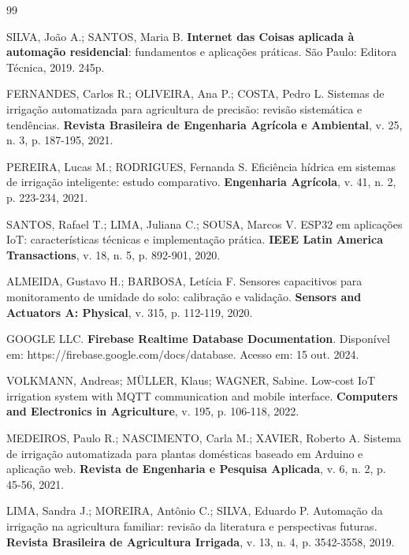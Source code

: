 
\begin{thebibliography}{99}

SILVA, João A.; SANTOS, Maria B. \textbf{Internet das Coisas aplicada à automação residencial}: fundamentos e aplicações práticas. São Paulo: Editora Técnica, 2019. 245p.

FERNANDES, Carlos R.; OLIVEIRA, Ana P.; COSTA, Pedro L. Sistemas de irrigação automatizada para agricultura de precisão: revisão sistemática e tendências. \textbf{Revista Brasileira de Engenharia Agrícola e Ambiental}, v. 25, n. 3, p. 187-195, 2021.

PEREIRA, Lucas M.; RODRIGUES, Fernanda S. Eficiência hídrica em sistemas de irrigação inteligente: estudo comparativo. \textbf{Engenharia Agrícola}, v. 41, n. 2, p. 223-234, 2021.

SANTOS, Rafael T.; LIMA, Juliana C.; SOUSA, Marcos V. ESP32 em aplicações IoT: características técnicas e implementação prática. \textbf{IEEE Latin America Transactions}, v. 18, n. 5, p. 892-901, 2020.

ALMEIDA, Gustavo H.; BARBOSA, Letícia F. Sensores capacitivos para monitoramento de umidade do solo: calibração e validação. \textbf{Sensors and Actuators A: Physical}, v. 315, p. 112-119, 2020.

GOOGLE LLC. \textbf{Firebase Realtime Database Documentation}. Disponível em: https://firebase.google.com/docs/database. Acesso em: 15 out. 2024.

VOLKMANN, Andreas; MÜLLER, Klaus; WAGNER, Sabine. Low-cost IoT irrigation system with MQTT communication and mobile interface. \textbf{Computers and Electronics in Agriculture}, v. 195, p. 106-118, 2022.

MEDEIROS, Paulo R.; NASCIMENTO, Carla M.; XAVIER, Roberto A. Sistema de irrigação automatizada para plantas domésticas baseado em Arduino e aplicação web. \textbf{Revista de Engenharia e Pesquisa Aplicada}, v. 6, n. 2, p. 45-56, 2021.

LIMA, Sandra J.; MOREIRA, Antônio C.; SILVA, Eduardo P. Automação da irrigação na agricultura familiar: revisão da literatura e perspectivas futuras. \textbf{Revista Brasileira de Agricultura Irrigada}, v. 13, n. 4, p. 3542-3558, 2019.

\end{thebibliography}


